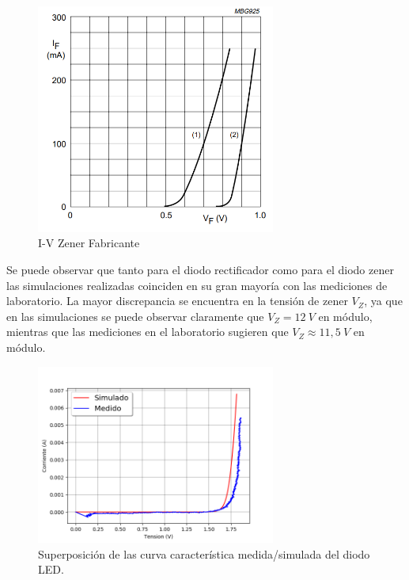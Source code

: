 \documentclass[a4paper]{article}
\begin{document}
\begin{figure}[H]
	\centering
	\includegraphics[width=0.7\textwidth]{IVZener.PNG}
	\caption{I-V Zener Fabricante}
	\label{fig:diodozen}
\end{figure}
Se puede observar que tanto para el diodo rectificador como para el diodo zener las simulaciones realizadas coinciden en su gran mayoría con las mediciones de laboratorio. La mayor discrepancia se encuentra en la tensión de zener $V_Z$, ya que en las simulaciones se puede observar claramente que $V_Z=12 \ V$ en módulo, mientras que las mediciones en el laboratorio sugieren que $V_Z \approx 11,5 \ V$ en módulo.

\begin{figure}[H]
	\centering
	\includegraphics[width=0.7\textwidth]{CurvaDiodosLed.png}
	\caption{Superposición de las curva característica medida/simulada del diodo LED.}
	\label{fig:diodoled}
\end{figure}
\end{document}

